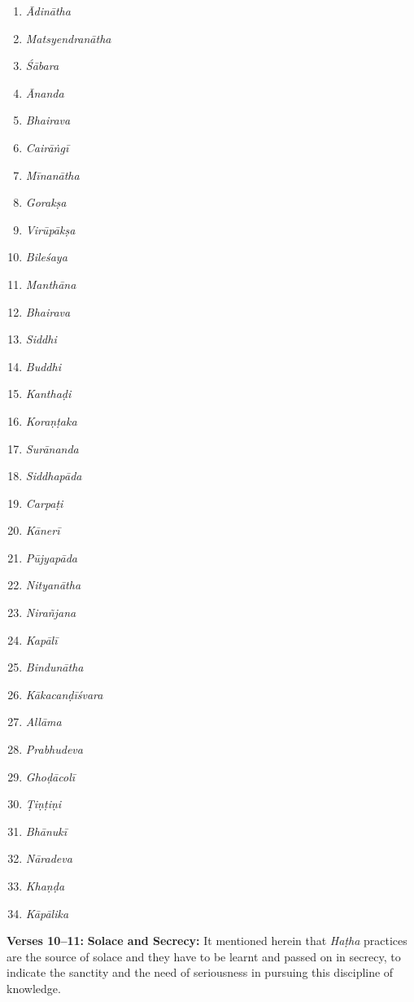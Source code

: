 \begin{multicols}{3}
\begin{enumerate}
\itemsep=0pt
\item \textit{Ādinātha}
\item \textit{Matsyendranātha}
\item \textit{Śābara}
\item \textit{Ānanda}
\item \textit{Bhairava }
\item \textit{Cairāṅgī }
\item \textit{Mīnanātha}
\item \textit{Gorakṣa }
\item \textit{Virūpākṣa }
\item \textit{Bileśaya }
\item \textit{Manthāna}
\item \textit{Bhairava }
\item \textit{Siddhi}
\item \textit{Buddhi}
\item \textit{Kanthaḍi }
\item \textit{Koraṇṭaka }
\item \textit{Surānanda}
\item \textit{Siddhapāda }
\item \textit{Carpaṭi}
\item \textit{Kānerī}
\item \textit{Pūjyapāda}
\item \textit{Nityanātha}
\item \textit{Nirañjana}
\item \textit{Kapālī }
\item \textit{Bindunātha}
\item \textit{Kākacanḍīśvara}
\item \textit{Allāma}
\item \textit{Prabhudeva}
\item \textit{Ghoḍācolī}
\item \textit{Ṭiṇṭiṇi}
\item \textit{Bhānukī}
\item \textit{Nāradeva}
\item \textit{Khaṇḍa}
\item \textit{Kāpālika}
\end{enumerate}
\end{multicols}


\textbf{Verses 10--11:} \textbf{Solace and Secrecy:} It mentioned herein that \textit{Haṭha} practices are the source of solace and they have to be learnt and passed on in secrecy, to indicate the sanctity and the need of seriousness in pursuing this discipline of knowledge.

